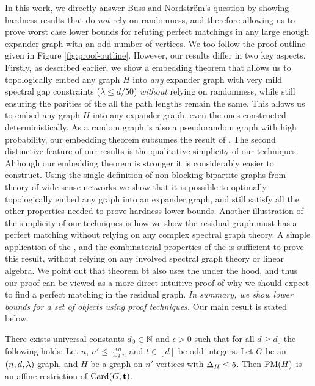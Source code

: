 \documentclass[11pt]{article}
\begin{document}
In this work, we directly answer Buss and Nordstr{\"o}m's question by showing hardness results that do \emph{not} rely on randomness, and therefore allowing us to prove worst case lower bounds for refuting perfect matchings in any large enough expander graph with an odd number of vertices.
We too follow the proof outline given in Figure \ref{fig:proof-outline}.
However, our results differ in two key aspects.
Firstly, as described earlier, we show a embedding theorem that allows us to topologically embed any graph $H$ into \emph{any} expander graph with very mild spectral gap constraints ($\lambda \leq d/50$) \emph{without} relying on randomness, while still ensuring the parities of the all the path lengths remain the same.
This allows us to embed any graph $H$ into any expander graph, even the ones constructed deterministically.
As a random graph is also a pseudorandom graph with high probability, our embedding theorem subsumes the result of \citet{Austrin_2022}.
The second distinctive feature of our results is the qualitative simplicity of our techniques.
Although our embedding theorem is stronger it is considerably easier to construct.
Using the single definition of non-blocking bipartite graphs from theory of wide-sense networks \citep{feldman1988wide} we show that it is possible to optimally topologically embed any graph into an expander graph, and still satisfy all the other properties needed to prove hardness lower bounds.
Another illustration of the simplicity of our techniques is how we show the residual graph must has a perfect matching without relying on any complex spectral graph theory.
A simple application of the , and the combinatorial properties of the  is sufficient to prove this result, without relying on any involved spectral graph theory or linear algebra.
We point out that theorem bt \citet[Theorem 2.3]{brouwer2005eigenvalues} also uses the  under the hood, and thus our proof can be viewed as a more direct intuitive proof of why we should expect to find a perfect matching in the residual graph.
\textit{In summary, we show  lower bounds for a  set of objects using  proof techniques.
} Our main result is stated below.


\begin{theorem}\label{thm:general-hardness-result}
  There exists universal constants $d_0 \in \mathbb{N}$ and $\epsilon > 0$ such that for all $d \ge d_0$ the following holds: Let $n$, $n' \le \frac{\epsilon n}{\log n}$ and $t \in [d]$ be odd integers.
  Let $G$ be an $(n, d, \lambda)$ graph, and $H$ be a graph on $n'$ vertices with $\Delta_{H} \le 5$.
  Then $\text{PM}(H)$ is an affine restriction of $\text{Card}(G, \mathbf{t})$.
\end{theorem}
\end{document}

